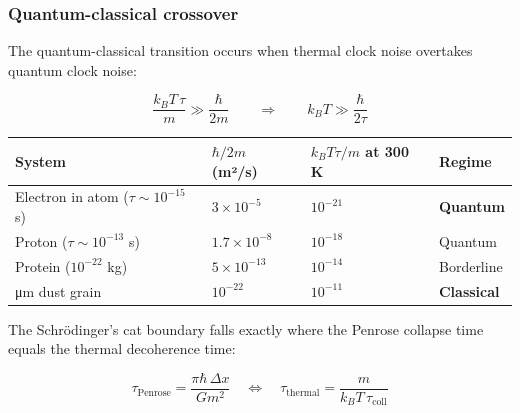 \documentclass[
]{article}
\newcounter{none} %
\begin{document}
\subsubsection{Quantum-classical
crossover}\label{quantum-classical-crossover}

The quantum-classical transition occurs when thermal clock noise
overtakes quantum clock noise:

\[\frac{k_B T\,\tau}{m} \gg \frac{\hbar}{2m} \qquad \Longrightarrow \qquad k_B T \gg \frac{\hbar}{2\tau}\]

{\def\LTcaptype{none} %
\begin{longtable}[]{@{}
  >{\raggedright\arraybackslash}p{}
  >{\raggedright\arraybackslash}p{}
  >{\raggedright\arraybackslash}p{}
  >{\raggedright\arraybackslash}p{}@{}}
\toprule\noalign{}
\begin{minipage}[b]{\linewidth}\raggedright
System
\end{minipage} & \begin{minipage}[b]{\linewidth}\raggedright
\(\hbar/2m\) (m²/s)
\end{minipage} & \begin{minipage}[b]{\linewidth}\raggedright
\(k_BT\tau/m\) at 300 K
\end{minipage} & \begin{minipage}[b]{\linewidth}\raggedright
Regime
\end{minipage} \\
\midrule\noalign{}
\endhead
\bottomrule\noalign{}
\endlastfoot
Electron in atom (\(\tau \sim 10^{-15}\) s) & \(3\times 10^{-5}\) &
\(10^{-21}\) & \textbf{Quantum} \\
Proton (\(\tau \sim 10^{-13}\) s) & \(1.7\times 10^{-8}\) & \(10^{-18}\)
& Quantum \\
Protein (\(10^{-22}\) kg) & \(5\times 10^{-13}\) & \(10^{-14}\) &
Borderline \\
1 μm dust grain & \(10^{-22}\) & \(10^{-11}\) & \textbf{Classical} \\
\end{longtable}
}

The Schrödinger's cat boundary falls exactly where the Penrose collapse
time equals the thermal decoherence time:

\[\tau_{\text{Penrose}} = \frac{\pi\hbar\,\Delta x}{Gm^2} \quad \Longleftrightarrow \quad \tau_{\text{thermal}} = \frac{m}{k_B T\,\tau_{\text{coll}}}\]
\end{document}
